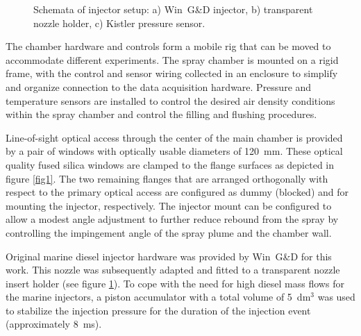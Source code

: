 \documentclass[letterpaper,twocolumn,10pt]{ilass}
\begin{document}
\begin{figure}[h]
\begin{center}
\end{center}
\vspace*{-5mm}
\caption{Schemata of injector setup:
         a) Win~G\&D injector,
				 b) transparent nozzle holder,
				 c) Kistler pressure sensor.}
\label{fig2} 
\end{figure}

The chamber hardware and controls form a mobile rig that can be moved to accommodate
different experiments.
%
The spray chamber is mounted on a rigid frame, with the control and sensor wiring collected
in an enclosure to simplify and organize connection to the data acquisition hardware.
Pressure and temperature sensors are installed to control the desired air density conditions
within the spray chamber and control the filling and flushing procedures.
%

Line-of-sight optical access through the center of the main chamber is provided by a pair
of windows with optically usable diameters of 120~mm. These optical quality fused silica windows are clamped to the flange surfaces as depicted in figure \ref{fig1}.
The two remaining flanges that are arranged orthogonally with respect to the primary
optical access are configured as dummy (blocked) and for mounting the injector, respectively.
%
The injector mount can be configured to allow a modest angle adjustment to further reduce
rebound from the spray by controlling the impingement angle of the spray plume and
the chamber wall.
%

Original marine diesel injector hardware was provided by Win~G\&D for this work.
This nozzle was subsequently adapted and fitted to a transparent nozzle insert holder
(see figure \ref{fig2}).
To cope with the need for high diesel mass flows for the marine injectors,
a piston accumulator with a total volume of 5~dm$^3$ was used to stabilize
the injection pressure for the duration of the injection event (approximately 8~ms). 
\end{document}
